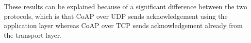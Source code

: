 These results can be explained because of a significant difference between the two protocols, which is that CoAP over UDP sends acknowledgement using the application layer whereas CoAP over TCP sends acknowledgement already from the transport layer. 

%
%



	




